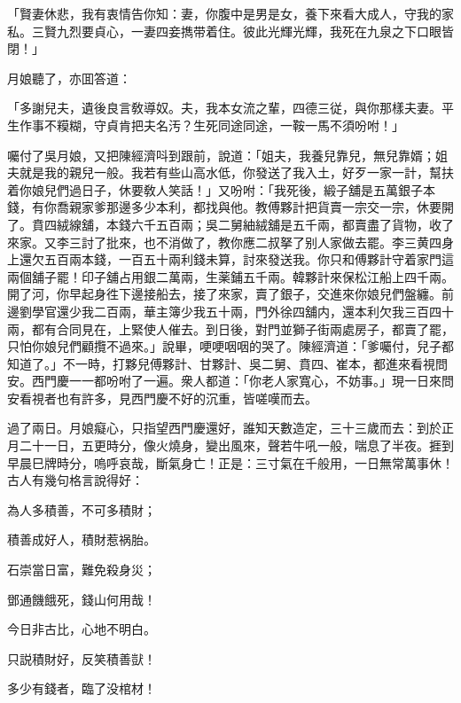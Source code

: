 \begin{myquote}
「賢妻休悲，我有衷情告你知：妻，你腹中是男是女，養下來看大成人，守我的家私。三賢九烈要貞心，一妻四妾擕带着住。彼此光輝光輝，我死在九泉之下口眼皆閉！」
\end{myquote}

月娘聽了，亦囬答道：

\begin{myquote}
「多謝兒夫，遺後良言敎導奴。夫，我本女流之輩，四德三従，與你那樣夫妻。平生作事不糢糊，守貞肯把夫名汚？生死同途同途，一鞍一馬不須吩咐！」
\end{myquote}

囑付了吳月娘，又把陳經濟呌到跟前，說道：「姐夫，我養兒靠兒，無兒靠婿；姐夫就是我的親兒一般。我若有些山高水低，你發送了我入土，好歹一家一計，幫扶着你娘兒們過日子，休要敎人笑話！」又吩咐：「我死後，緞子舖是五萬銀子本錢，有你喬親家爹那邊多少本利，都找與他。教傅夥計把貨賣一宗交一宗，休要開了。賁四絨線舖，本錢六千五百兩；吳二舅紬絨舖是五千兩，都賣盡了貨物，收了來家。又李三討了批來，也不消做了，教你應二叔拏了别人家做去罷。李三黄四身上還欠五百兩本錢，一百五十兩利錢未算，討來發送我。你只和傅夥計守着家門這兩個舖子罷！印子舖占用銀二萬兩，生薬鋪五千兩。韓夥計來保松江船上四千兩。開了河，你早起身徃下邊接船去，接了來家，賣了銀子，交進來你娘兒們盤纏。前邊劉學官還少我二百兩，華主簿少我五十兩，門外徐四舖内，還本利欠我三百四十兩，都有合同見在，上緊使人催去。到日後，對門並獅子街兩處房子，都賣了罷，只怕你娘兒們顧攬不過來。」說畢，哽哽咽咽的哭了。陳經濟道：「爹囑付，兒子都知道了。」不一時，打夥兒傅夥計、甘夥計、吳二舅、賁四、崔本，都進來看視問安。西門慶一一都吩咐了一遍。衆人都道：「你老人家寬心，不妨事。」現一日來問安看視者也有許多，見西門慶不好的沉重，皆嗟嘆而去。

過了兩日。月娘癡心，只指望西門慶還好，誰知天數造定，三十三歲而去：到於正月二十一日，五更時分，像火燒身，變出風來，聲若牛吼一般，喘息了半夜。捱到早晨巳牌時分，嗚呼哀哉，斷氣身亡！正是：三寸氣在千般用，一日無常萬事休！古人有幾句格言說得好：

\begin{myquote}
為人多積善，不可多積財；

積善成好人，積財惹祸胎。

石崇當日富，難免殺身災；

鄧通饑餓死，錢山何用哉！

今日非古比，心地不明白。

只説積財好，反笑積善獃！

多少有錢者，臨了没棺材！
\end{myquote}

